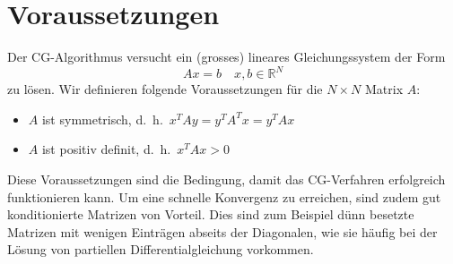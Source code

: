 \section{Voraussetzungen\label{cg:section:voraussetzungen}}

Der CG-Algorithmus versucht ein (grosses) lineares Gleichungssystem der Form
\begin{equation}
Ax = b \quad x, b \in \mathbb{R}^N
\end{equation}
zu lösen.
Wir definieren folgende Voraussetzungen für die $N\times N$ Matrix $A$:
\begin{itemize}
	\item $A$ ist symmetrisch, d.~h.~$x^T A y = y^T A^T x = y^T A x$
	\item $A$ ist positiv definit, d.~h.~$x^T A x > 0$
\end{itemize}
Diese Voraussetzungen sind die Bedingung, damit das CG-Verfahren erfolgreich funktionieren kann.
Um eine schnelle Konvergenz zu erreichen, sind zudem gut konditionierte Matrizen von Vorteil.
%
Dies sind zum Beispiel dünn besetzte Matrizen mit wenigen Einträgen abseits der Diagonalen, wie sie häufig bei der Lösung von partiellen Differentialgleichung vorkommen.
